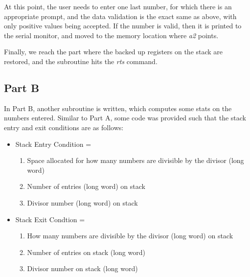 \documentclass[letterpaper]{article}
\begin{document}
    At this point, the user needs to enter one last number, for which there is
    an appropriate prompt, and the data validation is the exact same as above,
    with only positive values being accepted. If the number is valid, then it is
    printed to the serial monitor, and moved to the memory location where \textit{a2} points.

    Finally, we reach the part where the backed up registers on the stack are restored,
    and the subroutine hits the \textit{rts} command.


  \subsection{Part B}
    In Part B, another subroutine is written, which computes some stats
    on the numbers entered. Similar to Part A, some code was provided
    such that the stack entry and exit conditions are as follows:

    \begin{itemize}
      \item Stack Entry Condition =
        \begin{enumerate}
          \item Space allocated for how many numbers are divisible by the divisor (long word)
          \item Number of entries (long word) on stack
          \item Divisor number (long word) on stack
        \end{enumerate}
      \item Stack Exit Condtion =
        \begin{enumerate}
          \item How many numbers are divisible by the divisor (long word) on stack
          \item Number of entries on stack (long word)
          \item Divisor number on stack (long word)
        \end{enumerate}
    \end{itemize}
\end{document}
